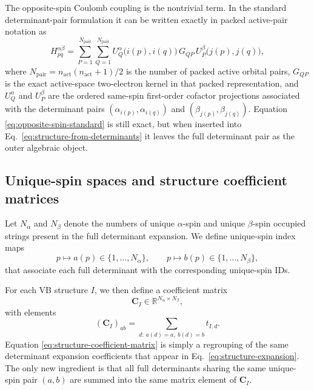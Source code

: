 \documentclass[journal=jctcce,manuscript=article]{achemso}
\newcommand{\na}{N_{\alpha}}
\newcommand{\nb}{N_{\beta}}
\newcommand{\npair}{N_{\mathrm{pair}}}
\newcommand{\Cmat}{\mathbf{C}}
\begin{document}
The opposite-spin Coulomb coupling is the nontrivial term. In the standard
determinant-pair formulation it can be written exactly in packed active-pair
notation as
\begin{equation}
H^{\alpha\beta}_{pq}
=
\sum_{P=1}^{\npair}
\sum_{Q=1}^{\npair}
U^{\alpha}_{Q}\!\bigl(i(p),i(q)\bigr)
\, G_{QP} \,
U^{\beta}_{P}\!\bigl(j(p),j(q)\bigr),
\label{eq:opposite-spin-standard}
\end{equation}
where $\npair = n_{\mathrm{act}}(n_{\mathrm{act}}+1)/2$ is the number of packed
active orbital pairs, $G_{QP}$ is the exact active-space two-electron kernel in
that packed representation, and $U^{\alpha}_{Q}$ and $U^{\beta}_{P}$ are the
ordered same-spin first-order cofactor projections associated with the
determinant pairs $(\alpha_{i(p)},\alpha_{i(q)})$ and
$(\beta_{j(p)},\beta_{j(q)})$. Equation \eqref{eq:opposite-spin-standard} is
still exact, but when inserted into Eq.~\eqref{eq:structure-from-determinants}
it leaves the full determinant pair as the outer algebraic object.

\subsection{Unique-spin spaces and structure coefficient matrices}
Let $\na$ and $\nb$ denote the numbers of unique $\alpha$-spin and unique
$\beta$-spin occupied strings present in the full determinant expansion. We
define unique-spin index maps
\begin{equation}
p \mapsto a(p) \in \{1,\dots,\na\},
\qquad
p \mapsto b(p) \in \{1,\dots,\nb\},
\label{eq:unique-spin-maps}
\end{equation}
that associate each full determinant with the corresponding unique-spin IDs.

For each VB structure $I$, we then define a coefficient matrix
\begin{equation}
\Cmat_I \in \mathbb{R}^{\na \times \nb},
\end{equation}
with elements
\begin{equation}
\left( \Cmat_I \right)_{ab}
=
\sum_{d:\, a(d)=a,\; b(d)=b} t_{I,d}.
\label{eq:structure-coefficient-matrix}
\end{equation}
Equation \eqref{eq:structure-coefficient-matrix} is simply a regrouping of the
same determinant expansion coefficients that appear in
Eq.~\eqref{eq:structure-expansion}. The only new ingredient is that all full
determinants sharing the same unique-spin pair $(a,b)$ are summed into the same
matrix element of $\Cmat_I$.
\end{document}
